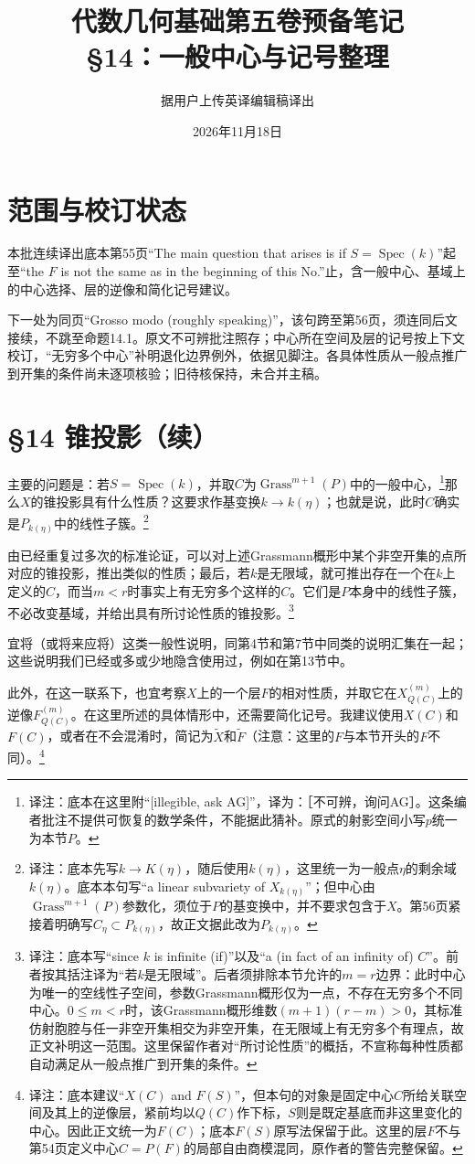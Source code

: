 \documentclass[openany,fontset=fandol]{ctexbook}
\newcommand{\note}[1]{\footnote{译注：#1}}
\begin{document}
\title{代数几何基础第五卷预备笔记\\§14：一般中心与记号整理}
\author{据用户上传英译编辑稿译出}
\date{2026年11月18日}
\maketitle
\chapter*{范围与校订状态}
本批连续译出底本第55页“The main question that arises is if $S=\operatorname{Spec}(k)$”起至“the $F$ is not the same as in the beginning of this No.”止，含一般中心、基域上的中心选择、层的逆像和简化记号建议。

下一处为同页“Grosso modo (roughly speaking)”，该句跨至第56页，须连同后文接续，不跳至命题14.1。原文不可辨批注照存；中心所在空间及层的记号按上下文校订，“无穷多个中心”补明退化边界例外，依据见脚注。各具体性质从一般点推广到开集的条件尚未逐项核验；旧待核保持，未合并主稿。
\chapter*{§14 锥投影（续）}
主要的问题是：若$S=\operatorname{Spec}(k)$，并取$C$为$\operatorname{Grass}^{m+1}(P)$中的一般中心，\note{底本在这里附“[illegible, ask AG]”，译为：［不可辨，询问AG］。这条编者批注不提供可恢复的数学条件，不能据此猜补。原式的射影空间小写$p$统一为本节$P$。}那么$X$的锥投影具有什么性质？这要求作基变换$k\to k(\eta)$；也就是说，此时$C$确实是$P_{k(\eta)}$中的线性子簇。\note{底本先写$k\to K(\eta)$，随后使用$k(\eta)$，这里统一为一般点$\eta$的剩余域$k(\eta)$。底本本句写“a linear subvariety of $X_{k(\eta)}$”；但中心由$\operatorname{Grass}^{m+1}(P)$参数化，须位于$P$的基变换中，并不要求包含于$X$。第56页紧接着明确写$C_\eta\subset P_{k(\eta)}$，故正文据此改为$P_{k(\eta)}$。}

由已经重复过多次的标准论证，可以对上述Grassmann概形中某个非空开集的点所对应的锥投影，推出类似的性质；最后，若$k$是无限域，就可推出存在一个在$k$上定义的$C$，而当$m<r$时事实上有无穷多个这样的$C$。它们是$P$本身中的线性子簇，不必改变基域，并给出具有所讨论性质的锥投影。\note{底本写“since $k$ is infinite (if)”以及“a (in fact of an infinity of) $C$”。前者按其括注译为“若$k$是无限域”。后者须排除本节允许的$m=r$边界：此时中心为唯一的空线性子空间，参数Grassmann概形仅为一点，不存在无穷多个不同中心。$0\le m<r$时，该Grassmann概形维数$(m+1)(r-m)>0$，其标准仿射胞腔与任一非空开集相交为非空开集，在无限域上有无穷多个有理点，故正文补明这一范围。这里保留作者对“所讨论性质”的概括，不宣称每种性质都自动满足从一般点推广到开集的条件。}

宜将（或将来应将）这类一般性说明，同第4节和第7节中同类的说明汇集在一起；这些说明我们已经或多或少地隐含使用过，例如在第13节中。

此外，在这一联系下，也宜考察$X$上的一个层$F$的相对性质，并取它在$X^{(m)}_{Q(C)}$上的逆像$F^{(m)}_{Q(C)}$。在这里所述的具体情形中，还需要简化记号。我建议使用$X(C)$和$F(C)$，或者在不会混淆时，简记为$\widetilde X$和$\widetilde F$（注意：这里的$F$与本节开头的$F$不同）。\note{底本建议“$X(C)$ and $F(S)$”，但本句的对象是固定中心$C$所给关联空间及其上的逆像层，紧前均以$Q(C)$作下标，$S$则是既定基底而非这里变化的中心。因此正文统一为$F(C)$；底本$F(S)$原写法保留于此。这里的层$F$不与第54页定义中心$C=P(F)$的局部自由商模混同，原作者的警告完整保留。}
\end{document}
